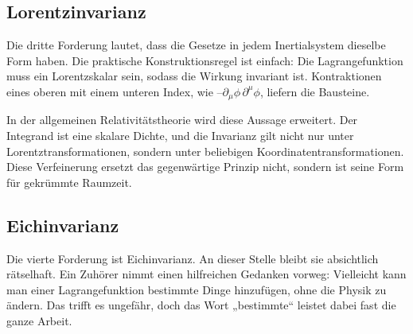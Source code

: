 \subsection{Lorentzinvarianz}

Die dritte Forderung lautet, dass die Gesetze in jedem Inertialsystem dieselbe Form haben. Die praktische Konstruktionsregel ist einfach: Die Lagrangefunktion muss ein Lorentzskalar sein, sodass die Wirkung invariant ist. Kontraktionen eines oberen mit einem unteren Index, wie --\(\partial_\mu\phi\,\partial^\mu\phi\), liefern die Bausteine.

In der allgemeinen Relativitätstheorie wird diese Aussage erweitert. Der Integrand ist eine skalare Dichte, und die Invarianz gilt nicht nur unter Lorentztransformationen, sondern unter beliebigen Koordinatentransformationen. Diese Verfeinerung ersetzt das gegenwärtige Prinzip nicht, sondern ist seine Form für gekrümmte Raumzeit.

\begin{classroomqa}
\end{classroomqa}

\begin{classroomqa}
\end{classroomqa}

\subsection{Eichinvarianz}

Die vierte Forderung ist Eichinvarianz. An dieser Stelle bleibt sie absichtlich rätselhaft. Ein Zuhörer nimmt einen hilfreichen Gedanken vorweg: Vielleicht kann man einer Lagrangefunktion bestimmte Dinge hinzufügen, ohne die Physik zu ändern. Das trifft es ungefähr, doch das Wort „bestimmte“ leistet dabei fast die ganze Arbeit.

